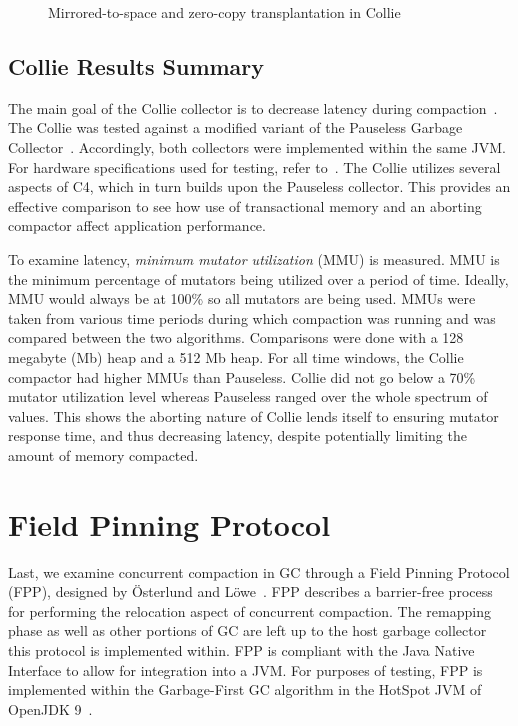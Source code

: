 \documentclass{sig-alternate}
\begin{document}
\begin{figure}
\centering
{}
\caption{Mirrored-to-space and zero-copy transplantation in Collie}
\label{fig:collieMirrored}
\end{figure}


\subsection{Collie Results Summary}
\label{sec:collieResults}


The main goal of the Collie collector is to decrease latency
during compaction~\cite{Iyengar:Collie}. The Collie was tested 
against a modified variant of the Pauseless Garbage Collector~\cite{Click:Pauseless}.
Accordingly, both collectors were implemented within the same JVM. For hardware
specifications used for testing, refer to~\cite{Iyengar:Collie}. The Collie
utilizes several aspects of C4, which in turn builds upon the Pauseless
collector. This provides an effective comparison to see how 
use of transactional memory and an aborting compactor affect application performance. 

To examine latency, \emph{minimum mutator utilization} (MMU) is measured.
MMU is the minimum percentage of mutators being utilized over a period of time. Ideally,
MMU would always be at 100\% so all mutators are being used. 
MMUs were taken from various time periods during which
compaction was running and was compared between the two algorithms. Comparisons were done
with a 128 megabyte (Mb) heap and a 512 Mb heap. For all time windows, the Collie compactor
had higher MMUs than Pauseless. Collie did not go below a 70\% mutator utilization 
level whereas Pauseless ranged over the whole spectrum of values. 
This shows the aborting nature of Collie
lends itself to ensuring mutator response time, and thus decreasing latency, 
despite potentially limiting the amount of memory compacted.


\section{Field Pinning Protocol}
\label{sec:fpp}

Last, we examine concurrent compaction in GC through a Field Pinning
Protocol (FPP), designed by \"{O}sterlund and L\"{o}we~\cite{Osterlund:FPP}.
FPP describes a barrier-free process for performing the relocation aspect
of concurrent compaction. The remapping phase as well as other portions
of GC are left up to the host garbage collector this
protocol is implemented within. FPP is compliant with the Java Native Interface
to allow for integration into a JVM. For purposes of testing, FPP 
is implemented within the Garbage-First GC algorithm in the HotSpot JVM 
of OpenJDK 9~\cite{Detlefs:G1}.
\end{document}
